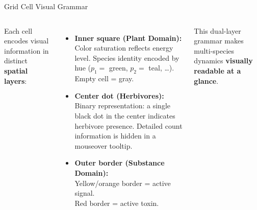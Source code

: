 \documentclass[aspectratio=169]{beamer}
\begin{document}
\begin{frame}{Grid Cell Visual Grammar}
    \begin{columns}[T, onlytextwidth]
        Each cell encodes visual information in distinct \textbf{spatial layers}:
        \begin{itemize}\footnotesize
            \item \textbf{Inner square (Plant Domain):}\\
            Color saturation reflects energy level. Species identity encoded by hue ($p_1 =$ green, $p_2 =$ teal, \ldots). Empty cell = gray.
            \item \textbf{Center dot (Herbivores):}\\
            Binary representation: a single black dot in the center indicates herbivore presence. Detailed count information is hidden in a mouseover tooltip.
            \item \textbf{Outer border (Substance Domain):}\\
            Yellow/orange border = active signal.\\
            Red border = active toxin.
        \end{itemize}
        \vspace{0.1cm}
        This dual-layer grammar makes multi-species dynamics \textbf{visually readable at a glance}.


\end{columns}
\end{frame}
\end{document}
